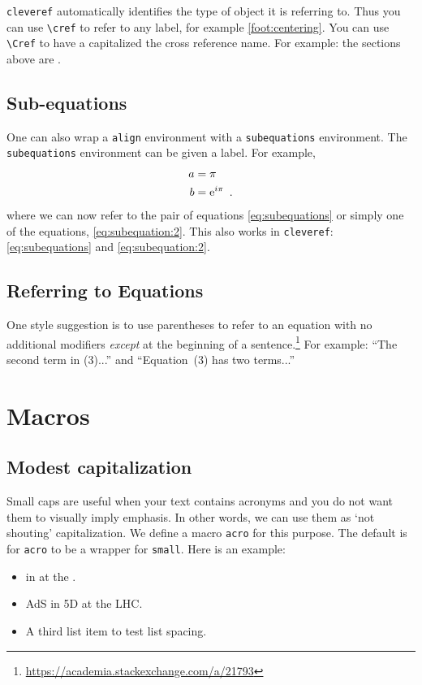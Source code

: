 \texttt{cleveref} automatically identifies the type of object it is referring to. Thus you can use \verb!\cref! to refer to any label, for example \cref{foot:centering}. You can use \verb!\Cref! to have a capitalized the cross reference name. For example: the sections above are .


\subsection{Sub-equations}

One can also wrap a \texttt{align} environment with a \texttt{subequations} environment. The \texttt{subequations} environment can be given a label. For example,
\begin{subequations}\label{eq:subequations}
\begin{align}
	a &= \pi 
	\label{eq:subequation:1}
	\\
	b &= \operatorname{e}^{i\pi} 
	\ .
	\label{eq:subequation:2}
\end{align}
\end{subequations}
where we can now refer to the pair of equations \eqref{eq:subequations} or simply one of the equations, \eqref{eq:subequation:2}. This also works in \texttt{cleveref}: \cref{eq:subequations} and \cref{eq:subequation:2}.


\subsection{Referring to Equations}

One style suggestion is to use parentheses to refer to an equation with no additional modifiers \emph{except} at the beginning of a sentence.\footnote{\url{https://academia.stackexchange.com/a/21793}} For example: ``The second term in (3)...'' and ``Equation~(3) has two terms...''



\section{Macros}
\label{sec:macros}


\subsection{Modest capitalization}

Small caps are useful when your text contains acronyms and you do not want them to visually imply emphasis. In other words, we can use them as `not shouting' capitalization. We define a macro \texttt{acro} for this purpose. The default is for \texttt{acro} to be a wrapper for \texttt{small}. Here is an example:
\begin{itemize}
	\item {} in  at the .
	\item AdS in 5D at the LHC. 
	\item A third list item to test list spacing.
\end{itemize}


